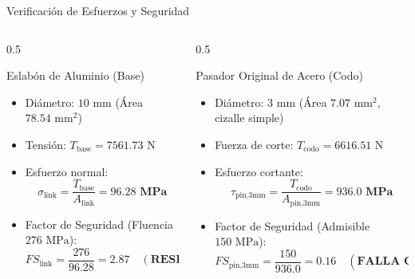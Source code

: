 \documentclass[aspectratio=169,11pt]{beamer}
\begin{document}
\begin{frame}{Verificación de Esfuerzos y Seguridad}
    \begin{columns}
        \begin{column}{0.5\textwidth}
            \begin{block}{Eslabón de Aluminio (Base)}
                \begin{itemize}
                    \item Diámetro: $10\text{ mm}$ (Área $78.54\text{ mm}^2$)
                    \item Tensión: $T_{\text{base}} = 7561.73\text{ N}$
                    \item Esfuerzo normal:
                    $$\sigma_{\text{link}} = \frac{T_{\text{base}}}{A_{\text{link}}} = \mathbf{96.28\text{ MPa}}$$
                    \item Factor de Seguridad (Fluencia $276\text{ MPa}$):
                    $$FS_{\text{link}} = \frac{276}{96.28} = \mathbf{2.87} \quad (\textbf{RESISTE})$$
                \end{itemize}
            \end{block}
        \end{column}
        \begin{column}{0.5\textwidth}
            \begin{block}{Pasador Original de Acero (Codo)}
                \begin{itemize}
                    \item Diámetro: $3\text{ mm}$ (Área $7.07\text{ mm}^2$, cizalle simple)
                    \item Fuerza de corte: $T_{\text{codo}} = 6616.51\text{ N}$
                    \item Esfuerzo cortante:
                    $$\tau_{\text{pin,3mm}} = \frac{T_{\text{codo}}}{A_{\text{pin,3mm}}} = \mathbf{936.0\text{ MPa}}$$
                    \item Factor de Seguridad (Admisible $150\text{ MPa}$):
                    $$FS_{\text{pin,3mm}} = \frac{150}{936.0} = \mathbf{0.16} \quad (\textbf{FALLA CRÍTICA})$$
                \end{itemize}
            \end{block}
        \end{column}
    \end{columns}
\end{frame}
\end{document}
